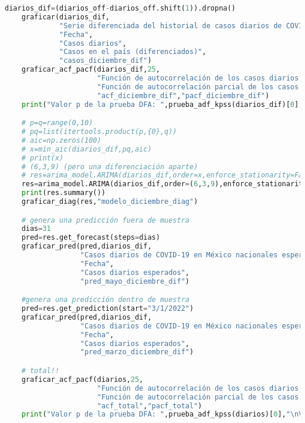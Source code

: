 \documentclass[11pt,letterpaper]{article}
\theoremstyle{definition}
\theoremstyle{theorem}
\theoremstyle{remark}
\begin{document}
\begin{appendices}
\begin{lstlisting}[language=Python]
    diarios_dif=(diarios_off-diarios_off.shift(1)).dropna()
    graficar(diarios_dif,
             "Serie diferenciada del historial de casos diarios de COVID-19 en México nacionales,\nDiciembre de 2021 a Mayo de 2022",
             "Fecha",
             "Casos diarios",
             "Casos en el país (diferenciados)",
             "casos_diciembre_dif")
    graficar_acf_pacf(diarios_dif,25,
                      "Función de autocorrelación de los casos diarios de COVID-19 diferenciados\na partir de diciembre del 2021",
                      "Función de autocorrelación parcial de los casos diarios de COVID-19 diferenciados\na partir de diciembre del 2021",
                      "acf_diciembre_dif","pacf_diciembre_dif")
    print("Valor p de la prueba DFA: ",prueba_adf_kpss(diarios_dif)[0],"\nValor p de la prueba KPSS: ",prueba_adf_kpss(diarios_dif)[1])

    # p=q=range(0,10)
    # pq=list(itertools.product(p,{0},q))
    # aic=np.zeros(100)
    # x=min_aic(diarios_dif,pq,aic)
    # print(x)
    # (6,3,9) (pero una diferenciación aparte)
    # res=arima_model.ARIMA(diarios_dif,order=x,enforce_stationarity=False,enforce_invertibility=False).fit()
    res=arima_model.ARIMA(diarios_dif,order=(6,3,9),enforce_stationarity=False,enforce_invertibility=False).fit()
    print(res.summary())
    graficar_diag(res,"modelo_diciembre_diag")

    # genera una predicción fuera de muestra
    dias=31
    pred=res.get_forecast(steps=dias)
    graficar_pred(pred,diarios_dif,
                  "Casos diarios de COVID-19 en México nacionales esperados a partir de Mayo del 2022\ncon datos de Diciembre del 2021, diferenciados",
                  "Fecha",
                  "Casos diarios esperados",
                  "pred_mayo_diciembre_dif")

    #genera una predicción dentro de muestra
    pred=res.get_prediction(start="3/1/2022")
    graficar_pred(pred,diarios_dif,
                  "Casos diarios de COVID-19 en México nacionales esperados a partir de Marzo del 2022\ncon datos de Diciembre del 2021, diferenciados",
                  "Fecha",
                  "Casos diarios esperados",
                  "pred_marzo_diciembre_dif")

    # total!!
    graficar_acf_pacf(diarios,25,
                      "Función de autocorrelación de los casos diarios de COVID-19",
                      "Función de autocorrelación parcial de los casos diarios de COVID-19",
                      "acf_total","pacf_total")
    print("Valor p de la prueba DFA: ",prueba_adf_kpss(diarios)[0],"\nValor p de la prueba KPSS:",prueba_adf_kpss(diarios)[1])


\end{lstlisting}
\end{appendices}
\end{document}
